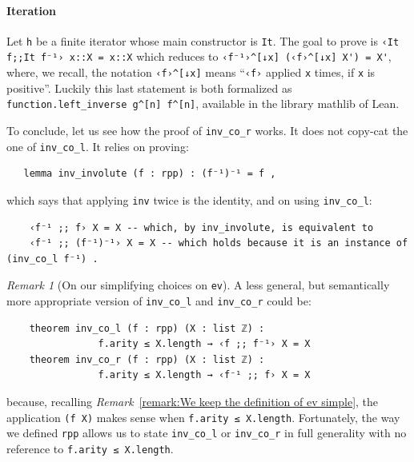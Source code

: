 \documentclass[preprint]{elsarticle}
\theoremstyle{remark}
\newtheorem{remark}{Remark}
\newcommand{\MATHLIB}{\textsf{mathlib}\xspace}
\newcommand{\LEAN}{\textsf{Lean}\xspace}
\begin{document}
\paragraph{Iteration} Let \lstinline|h| be a finite iterator whose main constructor is \lstinline|It|.
The goal to prove is \lstinline|‹It f;;It f⁻¹› x::X = x::X| which reduces to \lstinline|‹f⁻¹›^[↓x] (‹f›^[↓x] X') = X'|, where, we recall, the notation \lstinline|‹f›^[↓x]| means ``\lstinline|‹f›| applied \lstinline|x| times, if \lstinline|x| is positive''. Luckily this last statement is both formalized as \lstinline|function.left_inverse g^[n] f^[n]|, available in the library \MATHLIB of \LEAN.

\vspace{\baselineskip}
To conclude, let us see how the proof of \lstinline|inv_co_r| works. It does not copy-cat the one of \lstinline|inv_co_l|. It relies on proving:
\begin{lstlisting}
   lemma inv_involute (f : rpp) : (f⁻¹)⁻¹ = f ,
\end{lstlisting}
\noindent
which says that applying \lstinline|inv| twice is the identity, and on using \lstinline|inv_co_l|:
\begin{lstlisting}
    ‹f⁻¹ ;; f› X = X -- which, by inv_involute, is equivalent to
    ‹f⁻¹ ;; (f⁻¹)⁻¹› X = X -- which holds because it is an instance of (inv_co_l f⁻¹) .
\end{lstlisting}

\begin{remark}[On our simplifying choices on {\normalfont \lstinline|ev|}]
\label{remark:On our simplifying choices on ev}
A less general, but semantically more appropriate version of  \lstinline|inv_co_l| and \lstinline|inv_co_r| could be:
\begin{lstlisting}
    theorem inv_co_l (f : rpp) (X : list ℤ) :
                f.arity ≤ X.length → ‹f ;; f⁻¹› X = X
    theorem inv_co_r (f : rpp) (X : list ℤ) :
                f.arity ≤ X.length → ‹f⁻¹ ;; f› X = X
\end{lstlisting}
because, recalling \textit{Remark}~\ref{remark:We keep the definition of ev simple}, the application \lstinline|(f X)| makes sense when \lstinline|f.arity ≤ X.length|.
Fortunately, the way we defined \lstinline|rpp| allows us to state \lstinline|inv_co_l| or \lstinline|inv_co_r| in full generality
with no reference to \lstinline|f.arity ≤ X.length|.
\end{remark}
\end{document}
